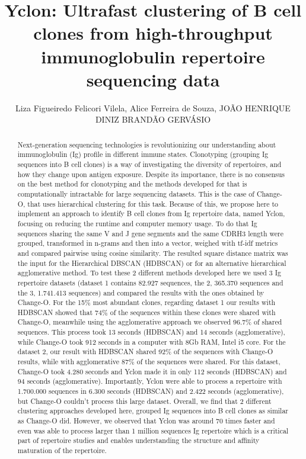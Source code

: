 \documentclass[twoside]{article}
\title{\vspace{-15mm}\fontsize{24pt}{10pt}\selectfont\textbf{ Yclon: Ultrafast clustering of B cell clones from high-throughput immunoglobulin repertoire sequencing data }} %
\author{ Liza Figueiredo Felicori Vilela,  Alice Ferreira de Souza,  JO\~AO HENRIQUE DINIZ BRAND\~AO GERV\'ASIO }
\affil{ UNIVERSIDADE FEDERAL DE MINAS GERAIS,  UNIVERSIDADE FEDERAL DE MINAS GERAIS }
\date{}
\begin{document}
  
  
  \maketitle %
  
  
  \thispagestyle{fancy} %
  
  
  \begin{abstract}
  Next-generation sequencing technologies is revolutionizing our understanding about immunoglobulin (Ig) profile in different immune states. Clonotyping (grouping Ig sequences into B cell clones) is a way of investigating the diversity of repertoires,  and how they change upon antigen exposure. Despite its importance,  there is no consensus on the best method for clonotyping and the methods developed for that is computationally intractable for large sequencing datasets. This is the case of Change-O,  that uses hierarchical clustering for this task. 
Because of this,  we propose here to implement an approach to identify B cell clones from Ig repertoire data,  named Yclon,  focusing on reducing the runtime and computer memory usage. To do that Ig sequences sharing the same V and J gene segments and the same CDRH3 length were grouped,  transformed in n-grams and then into a vector,  weighed with tf-idf metrics and compared pairwise using cosine similarity. The resulted square distance matrix was the input for the Hierarchical DBSCAN (HDBSCAN) or for an alternative hierarchical agglomerative method.
To test these 2 different methods developed here we used 3 Ig repertoire datasets (dataset 1 contains 82.927 sequences,  the 2,  365.370 sequences and the 3,  1.741.413 sequences) and compared the results with the ones obtained by Change-O. For the 15\% most abundant clones,  regarding dataset 1 our results with HDBSCAN showed that 74\% of the sequences within these clones were shared with Change-O,  meanwhile using the agglomerative approach we observed 96.7\% of shared sequences. This process took 13 seconds (HDBSCAN) and 14 seconds (agglomerative),  while Change-O took 912 seconds in a computer with 8Gb RAM,  Intel i5 core. For the dataset 2,  our result with HDBSCAN shared 92\% of the sequences with Change-O results,  while with agglomerative 87\% of the sequences were shared. For this dataset,  Change-O took 4.280 seconds and Yclon made it in only 112 seconds (HDBSCAN) and 94 seconds (agglomerative). Importantly,  Yclon were able to process a repertoire with 1.700.000 sequences in 6.300 seconds (HDBSCAN) and 2.422 seconds (agglomerative),  but Change-O couldn’t process this large dataset.
Overall,  we find that 2 different clustering approaches developed here,  grouped Ig sequences into B cell clones as similar as Change-O did. However,  we observed that Yclon was around 70 times faster and even was able to process larger than 1 million sequences Ig repertoire which is a critical part of repertoire studies and enables understanding the structure and affinity maturation of the repertoire.
  

\end{abstract}
\end{document}
